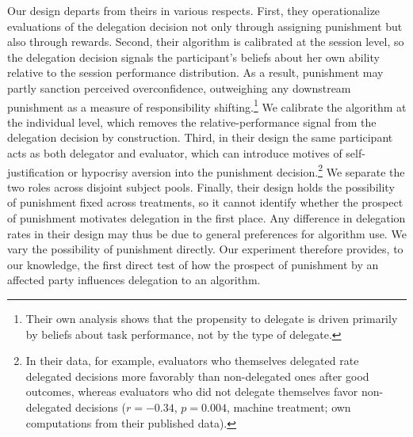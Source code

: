 Our design departs from theirs in various respects. First, they operationalize evaluations of the delegation decision not only through assigning punishment but also through rewards. Second, their algorithm is calibrated at the session level, so the delegation decision signals the participant's beliefs about her own ability relative to the session performance distribution. As a result, punishment may partly sanction perceived overconfidence, outweighing any downstream punishment as a measure of responsibility shifting.\footnote{Their own analysis shows that the propensity to delegate is driven primarily by beliefs about task performance, not by the type of delegate.} We calibrate the algorithm at the individual level, which removes the relative-performance signal from the delegation decision by construction. Third, in their design the same participant acts as both delegator and evaluator, which can introduce motives of self-justification or hypocrisy aversion into the punishment decision.\footnote{In their data, for example, evaluators who themselves delegated rate delegated decisions more favorably than non-delegated ones after good outcomes, whereas evaluators who did not delegate themselves favor non-delegated decisions ($r=-0.34$, $p=0.004$, machine treatment; own computations from their published data).} We separate the two roles across disjoint subject pools. Finally, their design holds the possibility of punishment fixed across treatments, so it cannot identify whether the prospect of punishment motivates delegation in the first place. Any difference in delegation rates in their design may thus be due to general preferences for algorithm use. We vary the possibility of punishment directly. Our experiment therefore provides, to our knowledge, the first direct test of how the prospect of punishment by an affected party influences delegation to an algorithm.

